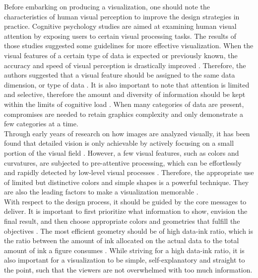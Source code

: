 \documentclass[11pt, a4paper,oneside,chapterprefix=false]{scrbook}
\begin{document}
Before embarking on producing a visualization, one should note the characteristics of human visual perception to improve the design strategies in practice. Cognitive psychology studies are aimed at examining human visual attention by exposing users to certain visual processing tasks. The results of those studies suggested some guidelines for more effective visualization. When the visual features of a certain type of data is expected or previously known, the accuracy and speed of visual perception is drastically improved \cite{haroz2012capacity}. Therefore, the authors suggested that a visual feature should be assigned to the same data dimension, or type of data \cite{haroz2012capacity}. It is also important to note that attention is limited and selective, therefore the amount and diversity of information should be kept within the limits of cognitive load \cite{alhadad2018visualizing}. When many categories of data are present, compromises are needed to retain graphics complexity and only demonstrate a few categories at a time. \\

Through early years of research on how images are analyzed visually, it has been found that detailed vision is only achievable by actively focusing on a small portion of the visual field \cite{itti2001computational, noton1971scanpaths}. However, a few visual features, such as colors and curvatures, are subjected to pre-attentive processing, which can be effortlessly and rapidly detected by low-level visual processes \cite{healey2011attention}. Therefore, the appropriate use of limited but distinctive colors and simple shapes is a powerful technique. They are also the leading factors to make a visualization memorable \cite{borkin2013makes}. \\

With respect to the design process, it should be guided by the core messages to deliver. It is important to first prioritize what information to show, envision the final result, and then choose appropriate colors and geometries that fulfill the objectives \cite{midway2020principles}. The most efficient geometry should be of high data-ink ratio, which is the ratio between the amount of ink allocated on the actual data to the total amount of ink a figure consumes \cite{tufte1983visual}. While striving for a high data-ink ratio, it is also important for a visualization to be simple, self-explanatory and straight to the point, such that the viewers are not overwhelmed with too much information. \\
\end{document}
